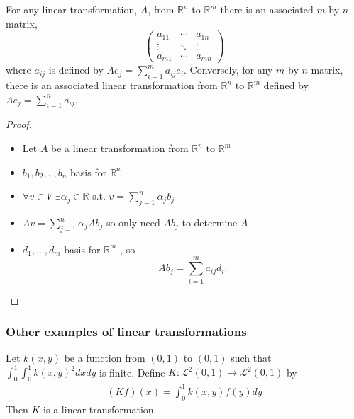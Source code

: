 \documentclass[compress]{beamer}
\def\R{\mathbb{R}}
\newcommand{\gmatrix}[1]{\begin{pmatrix} {#1}_{11} & \cdots &
    {#1}_{1n} \\ \vdots & \ddots & \vdots \\ {#1}_{m1} & \cdots &
    {#1}_{mn} \end{pmatrix}}
\theoremstyle{definition}
\begin{document}
\begin{frame}
  \begin{theorem}
    For any linear transformation, $A$, from $\R^n$ to $\R^m$ there is an
    associated $m$ by $n$ matrix,
    \[ 
    \gmatrix{a}
    \]
    where $a_{ij}$ is defined by $A e_j = \sum_{i=1}^m a_{ij}
    e_i$. Conversely, for any $m$ by $n$ matrix, there is an associated
    linear transformation from $\R^n$ to $\R^m$ defined by $A e_j =
    \sum_{i=1}^n a_{ij}$.
  \end{theorem}
\end{frame}

\begin{frame}
  \begin{proof}
    \begin{itemize} 
    \item Let $A$ be a linear transformation from $\R^n$ to
      $\R^m$
    \item $b_1, b_2, .., b_n$ basis for $\R^n$
    \item $\forall v \in V$ $\exists \alpha_j\in \R$ s.t. $v = \sum_{j=1}^n
      \alpha_j b_j$ 
    \item $A v = \sum_{j=1}^n \alpha_j A b_j$ so only need $A b_j$ to
      determine $A$
    \item $d_1, ..., d_m $ basis for $\R^m$ , so 
      \[
      A b_j = \sum_{i=1}^m a_{ij} d_i.
      \]
    \end{itemize}
  \end{proof}
\end{frame}

\begin{frame}
  \frametitle{Other examples of linear transformations}
  \begin{example}
    Let $k(x,y)$ be a function from $(0,1)$ to $(0,1)$ such that
    $\int_0^1 \int_0^1 k(x,y)^2 dx dy$ is finite.  Define
    $K:\mathcal{L}^2(0,1) \rightarrow \mathcal{L}^2(0,1)$ by
    \begin{align*}
      (K f) (x) = \int_0^1 k(x,y) f(y) dy
    \end{align*}
    Then $K$ is a linear transformation. 
  \end{example}
\end{frame}
\end{document}
